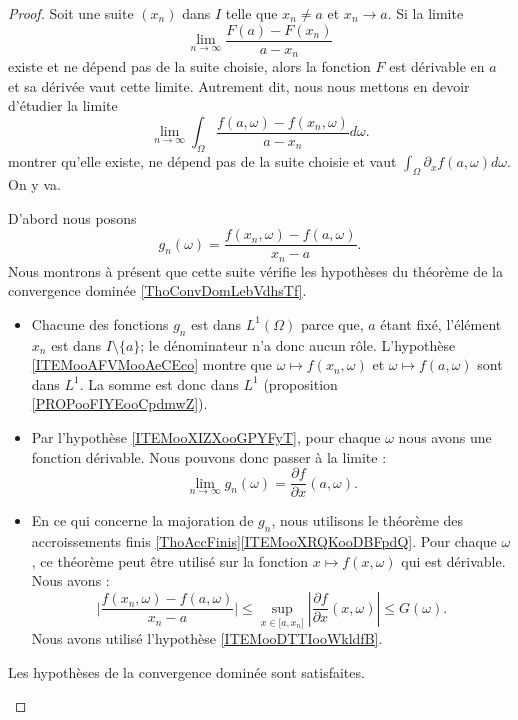 \begin{proof}
	Soit une suite \( (x_n)\) dans \( I\) telle que \( x_n\neq a\) et \( x_n\to a\). Si la limite
	\begin{equation}
		\lim_{n\to \infty} \frac{ F(a)-F(x_n) }{ a-x_n }
	\end{equation}
	existe et ne dépend pas de la suite choisie, alors la fonction \( F\) est dérivable en \( a\) et sa dérivée vaut cette limite. Autrement dit, nous nous mettons en devoir d'étudier la limite
	\begin{equation}    \label{EqLIiralx}
		\lim_{n\to \infty} \int_{\Omega}\frac{ f(a,\omega)-f(x_n,\omega) }{ a-x_n }d\omega.
	\end{equation}
	montrer qu'elle existe, ne dépend pas de la suite choisie et vaut \( \int_{\Omega}\partial_xf(a,\omega)d\omega\). On y va.

	\begin{subproof}
		D'abord nous posons
		\begin{equation}    \label{EqAFOUbQB}
			g_n(\omega)=\frac{ f(x_n,\omega)-f(a,\omega) }{ x_n-a }.
		\end{equation}
		Nous montrons à présent que cette suite vérifie les hypothèses du théorème de la convergence dominée \ref{ThoConvDomLebVdhsTf}.
		\begin{itemize}
			\item
			      Chacune des fonctions \( g_n\) est dans \( L^1(\Omega)\) parce que, \( a\) étant fixé, l'élément \( x_n\) est dans \( I\setminus\{ a \}\); le dénominateur n'a donc aucun rôle. L'hypothèse \ref{ITEMooAFVMooAeCEco} montre que \( \omega\mapsto f(x_n,\omega)\) et \( \omega\mapsto f(a,\omega)\) sont dans \( L^1\). La somme est donc dans \( L^1\) (proposition \ref{PROPooFIYEooCpdmwZ}).
			\item
			      Par l'hypothèse \ref{ITEMooXIZXooGPYFyT}, pour chaque \( \omega\) nous avons une fonction dérivable. Nous pouvons donc passer à la limite :
			      \begin{equation}
				      \lim_{n\to \infty} g_n(\omega)=\frac{ \partial f }{ \partial x }(a,\omega).
			      \end{equation}
			\item
			      En ce qui concerne la majoration de \( g_n\), nous utilisons le théorème des accroissements finis \ref{ThoAccFinis}\ref{ITEMooXRQKooDBFpdQ}. Pour chaque \( \omega\), ce théorème peut être utilisé sur la fonction \( x\mapsto f(x,\omega)\) qui est dérivable. Nous avons :
			      \begin{equation}
				      \big| \frac{  f(x_n,\omega)-f(a,\omega)   }{ x_n-a  } \big|\leq \sup_{x\in \mathopen[ a , x_n \mathclose]}| \frac{ \partial f }{ \partial x }(x,\omega) |\leq G(\omega).
			      \end{equation}
			      Nous avons utilisé l'hypothèse \ref{ITEMooDTTIooWkldfB}.
		\end{itemize}
		Les hypothèses de la convergence dominée sont satisfaites.


\end{subproof}
\end{proof}

